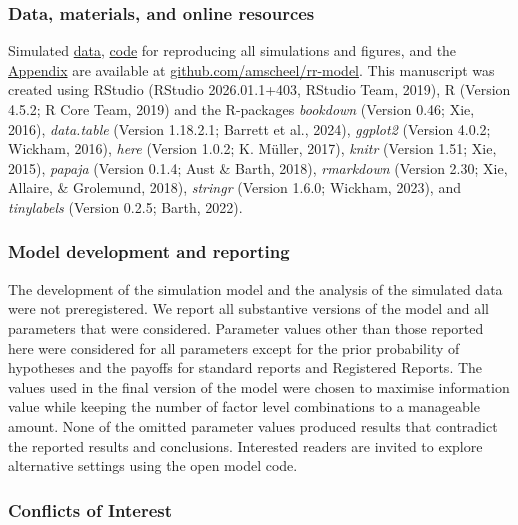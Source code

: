 \documentclass[
  british,
  a4paper,
  ,man,mask,floatsintext]{apa6}
\begin{document}
\subsubsection{Data, materials, and online resources}\label{data-materials-and-online-resources}

Simulated \href{https://github.com/amscheel/rr-model/tree/master/data}{data}, \href{https://github.com/amscheel/rr-model/tree/master/code}{code} for reproducing all simulations and figures, and the \href{https://github.com/amscheel/rr-model/blob/master/appendix/rr-risk-sensitivity_appendix.pdf}{Appendix} are available at \href{https://github.com/amscheel/rr-model}{github.com/amscheel/rr-model}.
This manuscript was created using RStudio (RStudio 2026.01.1+403, RStudio Team, 2019), R (Version 4.5.2; R Core Team, 2019) and the R-packages \emph{bookdown} (Version 0.46; Xie, 2016), \emph{data.table} (Version 1.18.2.1; Barrett et al., 2024), \emph{ggplot2} (Version 4.0.2; Wickham, 2016), \emph{here} (Version 1.0.2; K. Müller, 2017), \emph{knitr} (Version 1.51; Xie, 2015), \emph{papaja} (Version 0.1.4; Aust \& Barth, 2018), \emph{rmarkdown} (Version 2.30; Xie, Allaire, \& Grolemund, 2018), \emph{stringr} (Version 1.6.0; Wickham, 2023), and \emph{tinylabels} (Version 0.2.5; Barth, 2022).

\subsubsection{Model development and reporting}\label{model-development-and-reporting}

The development of the simulation model and the analysis of the simulated data were not preregistered.
We report all substantive versions of the model and all parameters that were considered.
Parameter values other than those reported here were considered for all parameters except for the prior probability of hypotheses and the payoffs for standard reports and Registered Reports.
The values used in the final version of the model were chosen to maximise information value while keeping the number of factor level combinations to a manageable amount.
None of the omitted parameter values produced results that contradict the reported results and conclusions.
Interested readers are invited to explore alternative settings using the open model code.

\subsubsection{Conflicts of Interest}\label{conflicts-of-interest}
\end{document}
